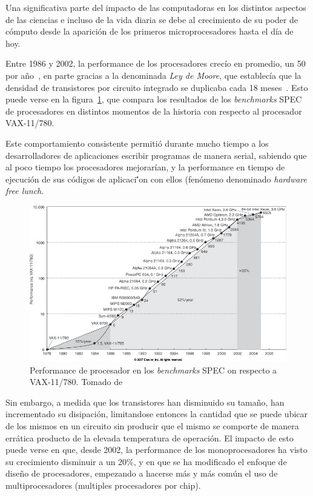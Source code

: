 Una significativa parte del impacto de las computadoras en los distintos aspectos de las 
ciencias e incluso de la vida diaria se debe al crecimiento de su
poder de c\'omputo desde la aparici\'on de los primeros microprocesadores hasta el
d\'ia de hoy.

Entre 1986 y 2002, la performance de los procesadores crec\'io en promedio, un 50%
por a\~no~\cite{Pacheco}, en parte gracias a la denominada \textit{Ley de Moore}, que 
establec\'ia que la densidad de transistores por circuito integrado se duplicaba 
cada 18 meses~\cite{HennessyPatterson}. Esto puede verse en la figura~\ref{processor_performance},
que compara los resultados de los \textit{benchmarks} SPEC de procesadores en distintos
momentos de la historia con respecto al procesador VAX-11/780. 

Este comportamiento consistente permiti\'o durante mucho tiempo a los desarrolladores 
de aplicaciones escribir programas de manera serial, sabiendo que al poco tiempo los procesadores
mejorar\'ian, y la performance en tiempo de ejecuci\'on de sus c\'odigos de aplicaci\''on con ellos (fen\'omeno denominado
\textit{hardware free lunch}.

\begin{figure}[htbp]
    \centering
    \includegraphics[width=\textwidth]{images/processor-performance.jpg}
    \caption{Performance de procesador en los \textit{benchmarks} SPEC on respecto a VAX-11/780. Tomado de~\cite{HennessyPatterson}}
    \label{processor_performance}
\end{figure}

Sin embargo, a medida que los transistores han disminuido su tama\~no, han incrementado
su disipaci\'on, limitandose entonces la cantidad que se puede ubicar de los mismos
en un circuito sin producir que el mismo se comporte de manera err\'atica producto
de la elevada temperatura de operaci\'on. El impacto de esto puede verse en que,
desde 2002, la performance de los monoprocesadores ha visto su crecimiento disminuir
a un 20\%, y en que se ha modificado el enfoque de dise\~no de procesadores, empezando
a hacerse m\'as y m\'as com\'un el uso de multiprocesadores (multiples procesadores
por chip).

